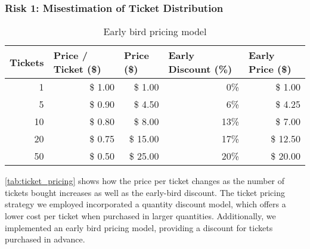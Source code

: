 \subsubsection{Risk 1: Misestimation of Ticket Distribution}

\begin{table}[H]
	\centering
	\caption{Early bird pricing model}
	\begin{tabular}{r|rr|rr}
	\multicolumn{1}{l|}{\textbf{Tickets}} & \multicolumn{1}{l}{\textbf{Price / Ticket (\$)}} & \multicolumn{1}{l|}{\textbf{Price (\$)}} & \multicolumn{1}{l}{\textbf{Early Discount (\%)}} & \multicolumn{1}{l}{\textbf{Early Price (\$)}} \\ \hline
	1                                     & \$ 1.00                                          & \$ 1.00                                  & 0\%                                              & \$ 1.00                                       \\
	5                                     & \$ 0.90                                          & \$ 4.50                                  & 6\%                                              & \$ 4.25                                       \\
	10                                    & \$ 0.80                                          & \$ 8.00                                  & 13\%                                             & \$ 7.00                                       \\
	20                                    & \$ 0.75                                          & \$ 15.00                                 & 17\%                                             & \$ 12.50                                      \\
	50                                    & \$ 0.50                                          & \$ 25.00                                 & 20\%                                             & \$ 20.00
	\end{tabular}
	\label{tab:ticket_pricing}
\end{table}

\autoref{tab:ticket_pricing} shows how the price per ticket changes as the number of tickets bought increases as well as the early-bird discount. The ticket pricing strategy we employed incorporated a quantity discount model, which offers a lower cost per ticket when purchased in larger quantities. Additionally, we implemented an early bird pricing model, providing a discount for tickets purchased in advance.

